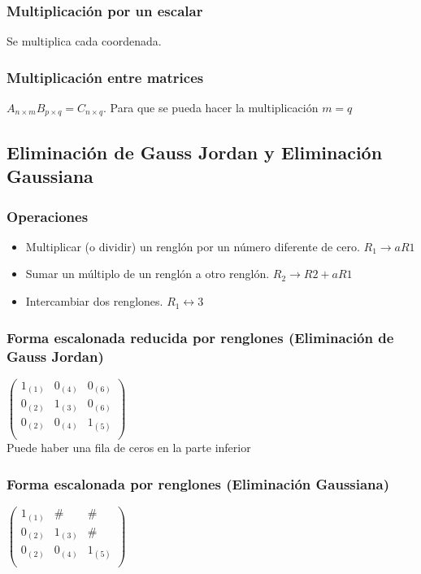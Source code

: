 \subsubsection{Multiplicación por un escalar}
Se multiplica cada coordenada.
\subsubsection{Multiplicación entre matrices}
$A_{n\times m}B_{p\times q}=C_{n\times q}$. Para que se pueda hacer la multiplicación $m=q$

\subsection{Eliminación de Gauss Jordan y Eliminación Gaussiana}

\subsubsection{Operaciones}
\begin{itemize}
	\item Multiplicar (o dividir) un renglón por un número diferente de cero. $R_1\rightarrow aR1$
	\item Sumar un múltiplo de un renglón a otro renglón. $R_2\rightarrow R2+aR1$
	\item Intercambiar dos renglones. $R_1\leftrightarrow3$
\end{itemize}

\subsubsection{Forma escalonada reducida por renglones (Eliminación de Gauss Jordan)}

$\begin{pmatrix}
1_{(1)} & 0_{(4)} & 0_{(6)}\\
0_{(2)} & 1_{(3)} & 0_{(6)}\\
0_{(2)} & 0_{(4)} & 1_{(5)}\\
\end{pmatrix}$
\\

Puede haber una fila de ceros en la parte inferior
\subsubsection{Forma escalonada por renglones (Eliminación Gaussiana)}

$\begin{pmatrix}
1_{(1)} & \# & \#\\
0_{(2)} & 1_{(3)} & \#\\
0_{(2)} & 0_{(4)} & 1_{(5)}\\
\end{pmatrix}$
\\

